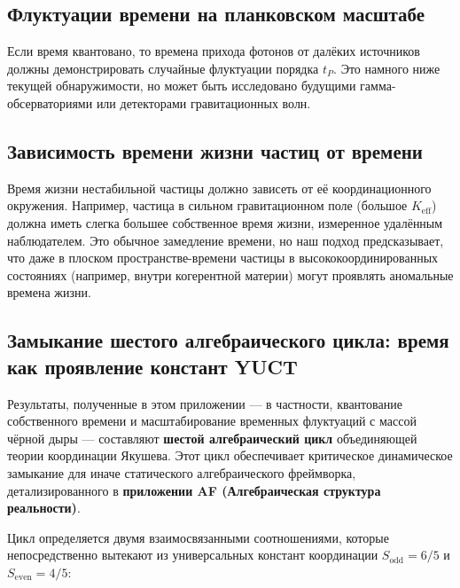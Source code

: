 \documentclass[12pt,a4paper]{article}
\newcommand{\Keff}{K_{\mathrm{eff}}}
\begin{document}
	\subsection{Флуктуации времени на планковском масштабе}
	
	Если время квантовано, то времена прихода фотонов от далёких источников должны демонстрировать случайные флуктуации порядка \(t_P\). Это намного ниже текущей обнаружимости, но может быть исследовано будущими гамма-обсерваториями или детекторами гравитационных волн.
	
	\subsection{Зависимость времени жизни частиц от времени}
	
	Время жизни нестабильной частицы должно зависеть от её координационного окружения. Например, частица в сильном гравитационном поле (большое \(\Keff\)) должна иметь слегка большее собственное время жизни, измеренное удалённым наблюдателем. Это обычное замедление времени, но наш подход предсказывает, что даже в плоском пространстве-времени частицы в высококоординированных состояниях (например, внутри когерентной материи) могут проявлять аномальные времена жизни.
	
	\subsection{Замыкание шестого алгебраического цикла: время как проявление констант YUCT}
	
	Результаты, полученные в этом приложении — в частности, квантование собственного времени и масштабирование временных флуктуаций с массой чёрной дыры — составляют \textbf{шестой алгебраический цикл} объединяющей теории координации Якушева. Этот цикл обеспечивает критическое динамическое замыкание для иначе статического алгебраического фреймворка, детализированного в \textbf{приложении AF (Алгебраическая структура реальности)}.
	
	Цикл определяется двумя взаимосвязанными соотношениями, которые непосредственно вытекают из универсальных констант координации \(S_{\mathrm{odd}} = 6/5\) и \(S_{\mathrm{even}} = 4/5\):
	
\end{document}
